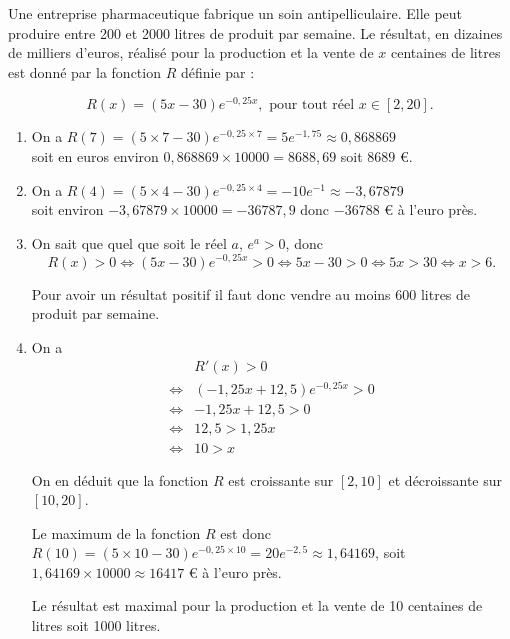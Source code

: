Une entreprise pharmaceutique fabrique un soin antipelliculaire. Elle peut produire entre 200 et 2000 litres de produit par semaine. Le résultat, en dizaines de milliers d’euros, réalisé pour la production et la vente de $x$ centaines de litres est donné par la fonction $R$ définie par :
	
	\[ R(x)= (5x - 30)e^{-0,25x}, \text{ pour tout réel } x \in [2, 20]. \]
	
\begin{enumerate}
	\item 	On a $R(7) = (5 \times 7 - 30)e^{-0,25 \times 7} = 5e^{-1,75} \approx 0,868869$\\
	 soit en euros environ $0,868869 \times 10000 = 8688,69$ soit $8689$ €.
	\item	On a $R(4)= (5 \times 4 - 30)e^{-0,25 \times 4} = -10e^{-1} \approx -3,67879$ \\
	soit environ $-3,67879 \times 10000 = -36787,9$ donc $-36788$ € à l’euro près.
	\item	On sait que quel que soit le réel $a$, $e^a > 0$, donc
	\[ R(x)> 0 \iff (5x - 30)e^{-0,25x} > 0 \iff 5x - 30 > 0 \iff 5x > 30 \iff x > 6. \]
	
	Pour avoir un résultat positif il faut donc vendre au moins 600 litres de produit par semaine.
	\item	On a  \begin{align*}
	&R'(x) > 0 \\
	\iff &(-1,25x + 12,5)e^{-0,25x} > 0 \\
	\iff& -1,25x + 12,5 > 0 \\
	\iff& 12,5 > 1,25x \\
	\iff& 10 > x
	\end{align*}
	

	
	On en déduit que la fonction $R$ est croissante sur $[2, 10]$ et décroissante sur $[10, 20]$.
	
	Le maximum de la fonction $R$ est donc $R(10) = (5 \times 10 - 30)e^{-0,25 \times 10} = 20e^{-2,5} \approx 1,64169$, soit $1,64169 \times 10000 \approx 16417$ € à l’euro près.
	
	Le résultat est maximal pour la production et la vente de 10 centaines de litres soit 1000 litres.
\end{enumerate}
